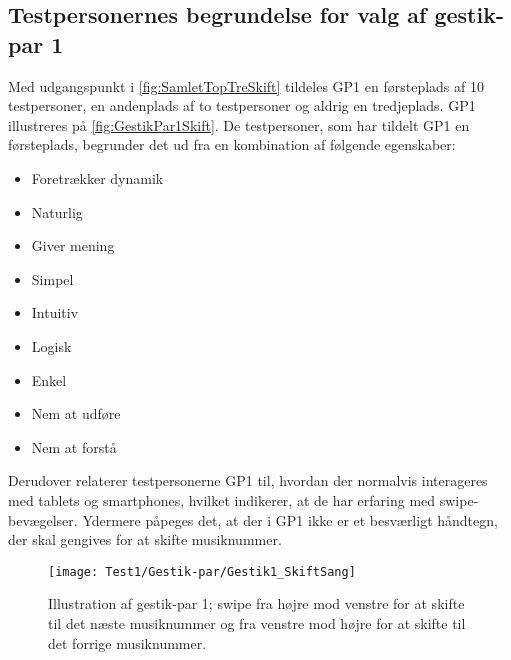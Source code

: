 \subsection{Testpersonernes begrundelse for valg af gestik-par 1}
\label{TestresultaterValgAfGestikkerBegrundelseGP1Skift}
%
Med udgangspunkt i \autoref{fig:SamletTopTreSkift} tildeles GP1 en førsteplads af 10 testpersoner, en andenplads af to testpersoner og aldrig en tredjeplads. GP1 illustreres på \autoref{fig:GestikPar1Skift}. De testpersoner, som har tildelt GP1 en førsteplads, begrunder det ud fra en kombination af følgende egenskaber: 
%
\begin{multicols}{3}
    \begin{itemize}
        \item Foretrækker dynamik
        \item Naturlig
        \item Giver mening
        \item Simpel
        \item Intuitiv
        \item Logisk
        \item Enkel
        \item Nem at udføre
        \item Nem at forstå
\end{itemize}
\end{multicols}
\noindent
%
Derudover relaterer testpersonerne GP1 til, hvordan der normalvis interageres med tablets og smartphones, hvilket indikerer, at de har erfaring med swipe-bevægelser. Ydermere påpeges det, at der i GP1 ikke er et besværligt håndtegn, der skal gengives for at skifte musiknummer.
%
\begin{figure}[H]
	\centering
	\texttt{[image: Test1/Gestik-par/Gestik1\_SkiftSang]}
	\caption{Illustration af gestik-par 1; swipe fra højre mod venstre for at skifte til det næste musiknummer og fra venstre mod højre for at skifte til det forrige musiknummer.}
	\label{fig:GestikPar1Skift}
\end{figure}
\noindent
%
